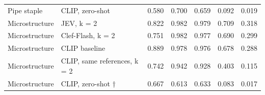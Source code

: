 \begin{table}
\begin{tabular}[t]{llrrrrr}
Pipe staple & CLIP, zero-shot & 0.580 & 0.700 & 0.659 & 0.092 & 0.019\\
\addlinespace
Microstructure & JEV, k = 2 & 0.822 & 0.982 & 0.979 & 0.709 & 0.318\\
Microstructure & Clef-Flash, k = 2 & 0.751 & 0.982 & 0.977 & 0.690 & 0.299\\
Microstructure & CLIP baseline & 0.889 & 0.978 & 0.976 & 0.678 & 0.288\\
Microstructure & CLIP, same references, k = 2 & 0.742 & 0.942 & 0.928 & 0.403 & 0.115\\
Microstructure & CLIP, zero-shot † & 0.667 & 0.613 & 0.633 & 0.083 & 0.017\\
\bottomrule
\end{tabular}
\end{table}
